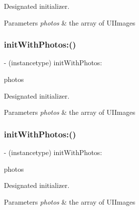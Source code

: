 Designated initializer. 
\begin{DoxyParams}{Parameters}
{\em photos} & the array of U\+I\+Images \\
\hline
\end{DoxyParams}
\mbox{\label{interfaceFBPhotoParams_aa20322b48f3dc61260103228cab4dc33}} 
\subsubsection{\texorpdfstring{init\+With\+Photos\+:()}{initWithPhotos:()}\hspace{0.1cm}{\footnotesize\ttfamily [4/5]}}
{\footnotesize\ttfamily -\/ (instancetype) init\+With\+Photos\+: \begin{DoxyParamCaption}\item[{(N\+S\+Array $\ast$)}]{photos }\end{DoxyParamCaption}}

Designated initializer. 
\begin{DoxyParams}{Parameters}
{\em photos} & the array of U\+I\+Images \\
\hline
\end{DoxyParams}
\mbox{\label{interfaceFBPhotoParams_aa20322b48f3dc61260103228cab4dc33}} 
\subsubsection{\texorpdfstring{init\+With\+Photos\+:()}{initWithPhotos:()}\hspace{0.1cm}{\footnotesize\ttfamily [5/5]}}
{\footnotesize\ttfamily -\/ (instancetype) init\+With\+Photos\+: \begin{DoxyParamCaption}\item[{(N\+S\+Array $\ast$)}]{photos }\end{DoxyParamCaption}}

Designated initializer. 
\begin{DoxyParams}{Parameters}
{\em photos} & the array of U\+I\+Images \\
\hline
\end{DoxyParams}


